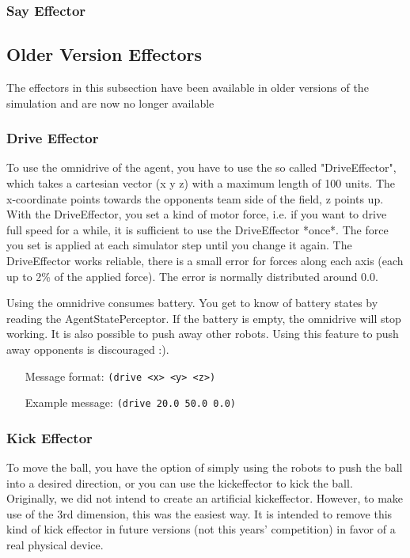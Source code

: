 \subsubsection{Say Effector}

\subsection{Older Version Effectors}
The effectors in this subsection have been available in older versions of the
simulation and are now no longer available

\subsubsection{Drive Effector}
To use the omnidrive of the agent, you have to use the so called
"DriveEffector", which takes a cartesian vector (x y z) with a maximum
length of 100 units. The x-coordinate points towards the opponents
team side of the field, z points up. With the DriveEffector, you set a
kind of motor force, i.e. if you want to drive full speed for a while,
it is sufficient to use the DriveEffector *once*. The force you set is
applied at each simulator step until you change it again. The
DriveEffector works reliable, there is a small error for forces along
each axis (each up to 2\% of the applied force). The error is normally
distributed around 0.0.

Using the omnidrive consumes battery. You get to know of battery
states by reading the AgentStatePerceptor. If the battery is empty,
the omnidrive will stop working. It is also possible to push away
other robots. Using this feature to push away opponents is discouraged
:).

\begin{itemize}
	\item[Message format:] \texttt{(drive <x> <y> <z>)}
	\item[Example message:] \texttt{(drive 20.0 50.0 0.0)}
\end{itemize}


\subsubsection{Kick Effector}
To move the ball, you have the option of simply using the robots to
push the ball into a desired direction, or you can use the
kickeffector to kick the ball. Originally, we did not intend to create
an artificial kickeffector. However, to make use of the 3rd dimension,
this was the easiest way. It is intended to remove this kind of kick
effector in future versions (not this years' competition) in favor of
a real physical device.

